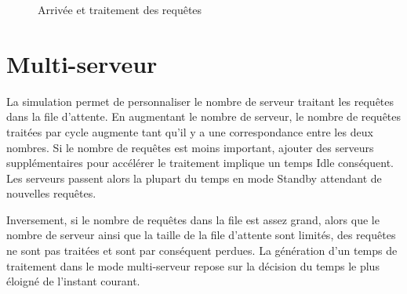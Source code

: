 \documentclass[12pt,a4paper]{article}
\begin{document}
        \begin{figure}[H]
            \begin {center}
            \end{center}
            \caption{Arrivée et traitement des requêtes}
        \end{figure}
        
        
    \newpage
    \section{Multi-serveur}
    \par La simulation permet de personnaliser le nombre de serveur traitant les requêtes dans la file d'attente.\newline
    En augmentant le nombre de serveur, le nombre de requêtes traitées par cycle augmente tant qu'il y a une correspondance entre les deux nombres. Si le nombre de requêtes est moins important, ajouter des serveurs supplémentaires pour accélérer le traitement implique un temps Idle conséquent. Les serveurs passent alors la plupart du temps en mode Standby attendant de nouvelles requêtes.
    \newline\par
    Inversement, si le nombre de requêtes dans la file est assez grand, alors que le nombre de serveur ainsi que la taille de la file d'attente sont limités, des requêtes ne sont pas traitées et sont par conséquent perdues.
    \newline
    La génération d'un temps de traitement dans le mode multi-serveur repose sur la décision du temps le plus éloigné de l'instant courant.
    \newline
    
\end{document}
